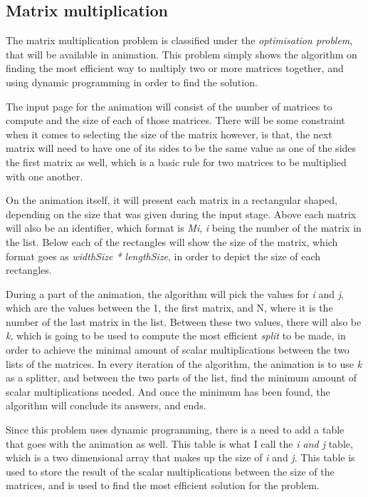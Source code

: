 \subsection{Matrix multiplication}
The matrix multiplication problem is classified under the \textit{optimisation problem}, that will be available in animation. This problem simply shows the algorithm on finding the most efficient way to multiply two or more matrices together, and using dynamic programming in order to find the solution. 

The input page for the animation will consist of the number of matrices to compute and the size of each of those matrices. There will be some constraint when it comes to selecting the size of the matrix however, is that, the next matrix will need to have one of its sides to be the same value as one of the sides the first matrix as well, which is a basic rule for two matrices to be multiplied with one another.

On the animation itself, it will present each matrix in a rectangular shaped, depending on the size that was given during the input stage. Above each matrix will also be an identifier, which format is \textit{Mi}, \textit{i} being the number of the matrix in the list. Below each of the rectangles will show the size of the matrix, which format goes as \textit{widthSize * lengthSize}, in order to depict the size of each rectangles.

During a part of the animation, the algorithm will pick the values for \textit{i} and \textit{j}, which are the values between the 1, the first matrix, and N, where it is the number of the last matrix in the list. Between these two values, there will also be \textit{k}, which is going to be used to compute the most efficient \textit{split} to be made, in order to achieve the minimal amount of scalar multiplications between the two lists of the matrices. In every iteration of the algorithm, the animation is to use \textit{k} as a splitter, and between the two parts of the list, find the minimum amount of scalar multiplications needed. And once the minimum has been found, the algorithm will conclude its answers, and ends.

Since this problem uses dynamic programming, there is a need to add a table that goes with the animation as well. This table is what I call the \textit{i and j} table, which is a two dimensional array that makes up the size of \textit{i} and \textit{j}. This table is used to store the result of the scalar multiplications between the size of the matrices, and is used to find the most efficient solution for the problem. 

